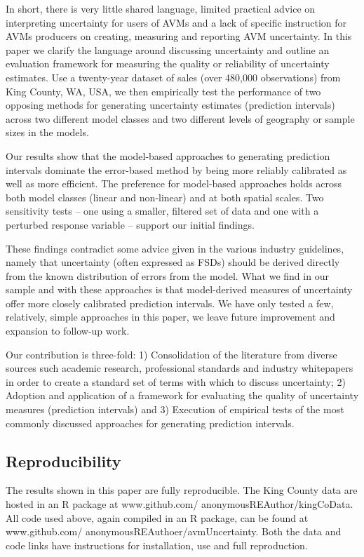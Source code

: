 \documentclass[colTwo]{format}
\theoremstyle{definition}
\begin{document}
In short, there is very little shared language, limited practical advice on interpreting uncertainty for users of AVMs  and a lack of specific instruction for AVMs producers on creating, measuring and reporting AVM uncertainty. In this paper we clarify the language around discussing uncertainty and outline an evaluation framework for measuring the quality or reliability of uncertainty estimates.  Use a twenty-year dataset of sales (over 480,000 observations) from King County, WA, USA, we then empirically test the performance of two opposing methods for generating uncertainty estimates (prediction intervals) across two different model classes and two different levels of geography or sample sizes in the models. 

Our results show that the model-based approaches to generating prediction intervals dominate the error-based method by being more reliably calibrated as well as more efficient.  The preference for model-based approaches holds across both model classes (linear and non-linear) and at both spatial scales. Two sensitivity tests -- one using a smaller, filtered set of data and one with a perturbed response variable -- support our initial findings.   

These findings contradict some advice given in the various industry guidelines, namely that uncertainty (often expressed as FSDs) should be derived directly from the known distribution of errors from the model.  What we find in our sample and with these approaches is that model-derived measures of uncertainty offer more closely calibrated prediction intervals.  We have only tested a few, relatively, simple approaches in this paper, we leave future improvement and expansion to follow-up work. 

Our contribution is three-fold: 1) Consolidation of the literature from diverse sources such academic research, professional standards and industry whitepapers in order to create a standard set of terms with which to discuss uncertainty; 2) Adoption and application of a framework for evaluating the quality of uncertainty measures (prediction intervals) and 3) Execution of empirical tests of the most commonly discussed approaches for generating prediction intervals.  

\subsection{Reproducibility}

The results shown in this paper are fully reproducible.  The King County data are hosted in an R package at www.github.com/ anonymousREAuthor/kingCoData.  All code used above, again compiled in an R package, can be found at www.github.com/ anonymousREAuthoer/avmUncertainty.  Both the data and code links have instructions for installation, use and full reproduction.   
\end{document}
